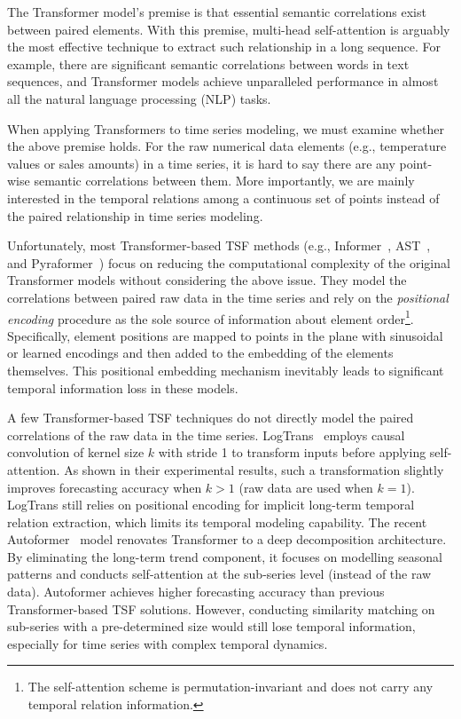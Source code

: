 \documentclass{article}
\begin{document}
The Transformer model's premise is that essential semantic correlations exist between paired elements. With this premise, multi-head self-attention is arguably the most effective technique to extract such relationship in a long sequence. For example, there are significant semantic correlations between words in text sequences, and Transformer models achieve unparalleled performance in almost all the natural language processing (NLP) tasks. 

When applying Transformers to time series modeling, we must examine whether the above premise holds. For the raw numerical data elements (e.g., temperature values or sales amounts) in a time series, it is hard to say there are any point-wise semantic correlations between them.  More importantly, we are mainly interested in the temporal relations among a continuous set of points instead of the paired relationship in time series modeling.  

Unfortunately, most Transformer-based TSF methods (e.g., Informer~\cite{Zhou2020InformerBE}, AST~\cite{Wu2020AdversarialST}, and Pyraformer~\cite{Liu2022Pyraformer}) focus on reducing the computational complexity of the original Transformer models without considering the above issue. They model the correlations between paired raw data in the time series and rely on the \emph{positional encoding} procedure as the sole source of information about element order\footnote{The self-attention scheme is permutation-invariant and does not carry any temporal relation information.}. Specifically, element positions are mapped to points in the plane with sinusoidal or learned encodings and then added to the embedding of the elements themselves. This positional embedding mechanism inevitably leads to significant temporal information loss in these models. 






A few Transformer-based TSF techniques do not directly model the paired correlations of the raw data in the time series. LogTrans~\citep{li2019enhancing} employs causal convolution of kernel size $k$ with stride 1 to transform inputs before applying self-attention. As shown in their experimental results, such a transformation slightly improves forecasting accuracy when $k>1$ (raw data are used when $k=1$). LogTrans still relies on positional encoding for implicit long-term temporal relation extraction, which limits its temporal modeling capability. The recent Autoformer~\citep{Wu2021AutoformerDT} model renovates Transformer to a deep decomposition architecture. By eliminating the long-term trend component, it focuses on modelling seasonal patterns and conducts self-attention at the sub-series level (instead of the raw data). Autoformer achieves higher forecasting accuracy than previous Transformer-based TSF solutions. However, conducting similarity matching on sub-series with a pre-determined size would still lose temporal information, especially for time series with complex temporal dynamics.    
\end{document}
